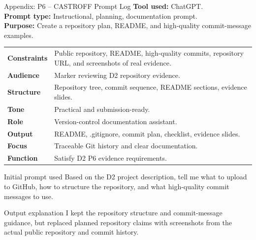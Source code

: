 \documentclass[10pt,aspectratio=169]{beamer}
\newcommand{\smallnote}[1]{\vspace{0.2em}{\scriptsize\textcolor{linegray}{#1}}}
\begin{document}
\begin{frame}{Appendix: P6 -- CASTROFF Prompt Log}
\tiny
\textbf{Tool used:} ChatGPT.\\
\textbf{Prompt type:} Instructional, planning, documentation prompt.\\
\textbf{Purpose:} Create a repository plan, README, and high-quality commit-message examples.
\vspace{0.35em}
\begin{tabularx}{\textwidth}{>{\bfseries}p{1.45cm}X}
Constraints & Public repository, README, high-quality commits, repository URL, and screenshots of real evidence.\\
Audience & Marker reviewing D2 repository evidence.\\
Structure & Repository tree, commit sequence, README sections, evidence slides.\\
Tone & Practical and submission-ready.\\
Role & Version-control documentation assistant.\\
Output & README, .gitignore, commit plan, checklist, evidence slides.\\
Focus & Traceable Git history and clear documentation.\\
Function & Satisfy D2 P6 evidence requirements.\\
\end{tabularx}
\begin{block}{Initial prompt used}
Based on the D2 project description, tell me what to upload to GitHub, how to structure the repository, and what high-quality commit messages to use.
\end{block}
\begin{block}{Output explanation}
I kept the repository structure and commit-message guidance, but replaced planned repository claims with screenshots from the actual public repository and commit history.
\end{block}
\vfill\smallnote{Source: [6].}
\end{frame}
\end{document}
